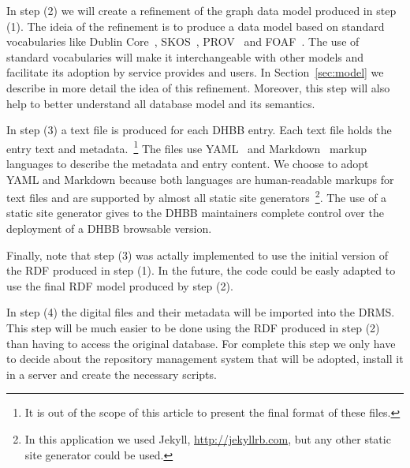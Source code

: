 
In step (2) we will create a refinement of the graph data model
produced in step (1). The ideia of the refinement is to produce a data
model based on standard vocabularies like Dublin Core~\cite{dc},
SKOS~\cite{skos}, PROV~\cite{prov} and FOAF~\cite{foaf}. The use of
standard vocabularies will make it interchangeable with other models
and facilitate its adoption by service provides and users. In
Section~\ref{sec:model} we describe in more detail the idea of this
refinement. Moreover, this step will also help to better understand
all database model and its semantics.

In step (3) a text file is produced for each DHBB entry. Each text
file holds the entry text and metadata.~\footnote{It is out
  of the scope of this article to present the final format of these
  files.} The files use YAML~\cite{yaml} and
Markdown~\cite{markdown} markup languages to describe the metadata
and entry content. We choose to adopt YAML and
Markdown because both languages are human-readable markups for text
files and are supported by almost all static site
generators~\footnote{In this application we used Jekyll, \url{http://jekyllrb.com}, but
  any other static site generator could be used.}. The use of a static
site generator gives to the DHBB maintainers complete control over the
deployment of a DHBB browsable version. 



Finally, note that step (3) was actally implemented to use the initial
version of the RDF produced in step (1). In the future, the code could
be easly adapted to use the final RDF model produced by step (2).

In step (4) the digital files and their metadata will be imported into
the DRMS. This step will be much easier to be done using the RDF
produced in step (2) than having to access the original database. For
complete this step we only have to decide about the repository
management system that will be adopted, install it in a server and
create the necessary scripts.


